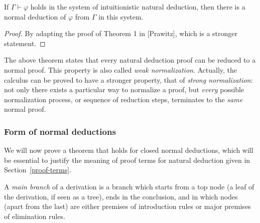 \begin{theorem}
  If $\Gamma \vdash \varphi$ holds in the system of intuitionistic natural
  deduction, then there is a normal deduction of $\varphi$ from $\Gamma$ in this
  system.
\end{theorem}
\begin{proof}
  By adapting the proof of Theorem 1 in [Prawitz], which is a stronger
  statement.
\end{proof}

The above theorem states that every natural deduction proof can be reduced to a
normal proof. This property is also called \emph{weak normalization}. Actually,
the calculus can be proved to have a stronger property, that of \emph{strong
  normalization}: not only there exists a particular way to normalize a proof,
but \emph{every} possible normalization process, or sequence of reduction steps,
terminates to the \emph{same} normal proof.

\subsubsection{Form of normal deductions}

We will now prove a theorem that holds for closed normal deductions, which will
be essential to justify the meaning of proof terms for natural deduction given
in Section~\ref{proof-terms}.

\begin{definition}
  A \emph{main branch} of a derivation is a branch which starts from a top node
  (a leaf of the derivation, if seen as a tree), ends in the conclusion, and in
  which nodes (apart from the last) are either premises of introduction rules or
  major premises of elimination rules.
\end{definition}

